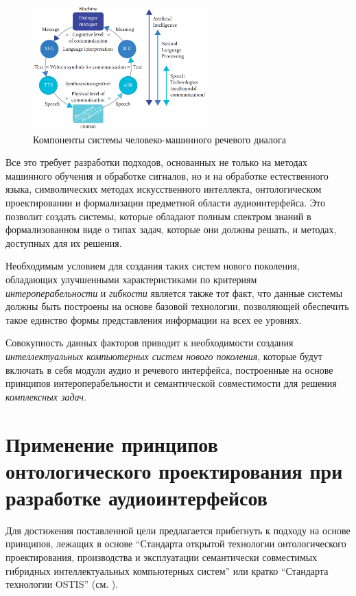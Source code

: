 \begin{figure}[H]
    \caption{Компоненты системы человеко-машинного речевого диалога \cite{Delic2019speech}}
    \includegraphics[scale=0.6, width=0.6\textwidth]{author/part4/figures/ch43_fig01_speech-hmi-components.png}
    
    \label{fig:speech-hmi-components}
\end{figure}

Все это требует разработки подходов, основанных не только на методах машинного обучения и обработке сигналов, но и на обработке естественного языка, символических методах искусственного интеллекта, онтологическом проектировании и формализации предметной области аудиоинтерфейса. Это позволит создать системы, которые обладают полным спектром знаний в формализованном виде о типах задач, которые они должны решать, и методах, доступных для их решения.

Необходимым условием для создания таких систем нового поколения, обладающих улучшенными характеристиками по критериям \textit{интероперабельности} и \textit{гибкости} является также тот факт, что данные системы должны быть построены на основе базовой технологии, позволяющей обеспечить такое единство формы представления информации на всех ее уровнях.
 
Совокупность данных факторов приводит к необходимости создания \textit{интеллектуальных компьютерных систем нового поколения}, которые будут включать в себя модули аудио и речевого интерфейса, построенные на основе принципов интероперабельности и семантической совместимости для решения \textit{комплексных задач}.


\section{Применение принципов онтологического проектирования при разработке аудиоинтерфейсов}
\label{sec_audio_interfaces_ostis_approach}

Для достижения поставленной цели предлагается прибегнуть к подходу на основе принципов, лежащих в основе ``Стандарта открытой технологии онтологического проектирования, производства и эксплуатации семантически совместимых гибридных интеллектуальных компьютерных систем'' или кратко ``Стандарта технологии OSTIS'' (см. ).


